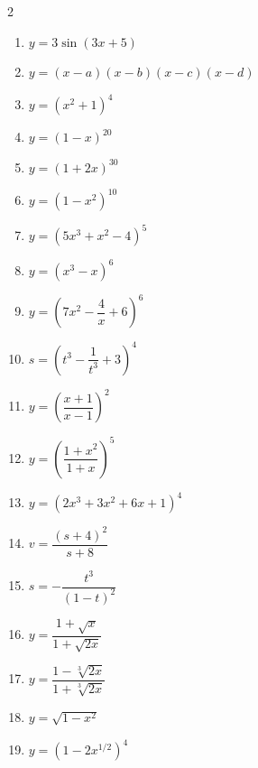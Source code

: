 \begin{multicols}{2}
\begin{enumerate}
  \item $y = 3 \sin(3x + 5)$
  \item $y = (x - a)(x - b)(x - c)(x - d)$
  \item $y = (x^2 + 1)^4$
  \item $y = (1 - x)^{20}$
  \item $y = (1 + 2x)^{30}$
  \item $y = (1 - x^2)^{10}$
  \item $y = (5x^3 + x^2 - 4)^5$
  \item $y = (x^3 - x)^6$
  \item $y = \left(7x^2 - \dfrac{4}{x} + 6\right)^6$
  \item $s = \left(t^3 - \dfrac{1}{t^3} + 3\right)^4$
  \item $y = \left(\dfrac{x+1}{x-1}\right)^2$
  \item $y = \left(\dfrac{1 + x^2}{1 + x}\right)^5$
  \item $y = (2x^3 + 3x^2 + 6x + 1)^4$
  \item $v = \dfrac{(s + 4)^2}{s + 8}$
  \item $s = -\dfrac{t^3}{(1 - t)^2}$
  \item $y = \dfrac{1 + \sqrt{x}}{1 + \sqrt{2x}}$
  \item $y = \dfrac{1 - \sqrt[3]{2x}}{1 + \sqrt[3]{2x}}$
  \item $y = \sqrt{1 - x^2}$
  \item $y = \left(1 - 2x^{1/2}\right)^4$
\end{enumerate}
\end{multicols}
